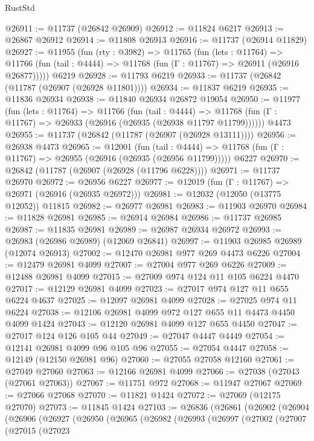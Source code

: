 \begin{lexlean}{RustStd}
\begin{coremodule}
@26911 := @11737 (@26842 @26909)
@26912 := @11824 @6217
@26913 := @26867 @26912
@26914 := @11808 @26913
@26916 := @11737 (@26914 @11829)
@26927 := @11955
    (fun (rty : @3982) =>
    @11765
      (fun (lets : @11764) =>
      @11766 (fun (tail : @4444) => @11768 (fun (Γ : @11767) => @26911 (@26916 @26877)))))
    @6219
@26928 := @11793 @6219
@26933 := @11737 (@26842 (@11787 (@26907 (@26928 @11801))))
@26934 := @11837 @6219
@26935 := @11836 @26934
@26938 := @11840 @26934 @26872 @19054
@26950 := @11977
    (fun (lets : @11764) =>
    @11766
      (fun (tail : @4444) =>
      @11768 (fun (Γ : @11767) => @26933 (@26916 (@26935 (@26938 @11797 @11799))))))
    @4473
@26955 := @11737 (@26842 (@11787 (@26907 (@26928 @13111))))
@26956 := @26938 @4473
@26965 := @12001
    (fun (tail : @4444) => @11768 (fun (Γ : @11767) => @26955 (@26916 (@26935 (@26956 @11799)))))
    @6227
@26970 := @26842 (@11787 (@26907 (@26928 (@11796 @6228))))
@26971 := @11737 @26970
@26972 := @26956 @6227
@26977 := @12019 (fun (Γ : @11767) => @26971 (@26916 (@26935 @26972)))
@26981 := @12032 (@12050 (@13775 @12052)) @11815
@26982 := @26977 @26981
@26983 := @11903 @26970
@26984 := @11828 @26981
@26985 := @26914 @26984
@26986 := @11737 @26985
@26987 := @11835 @26981
@26989 := @26987 @26934 @26972
@26993 := @26983 (@26986 @26989) (@12069 @26841)
@26997 := @11903 @26985 @26989 (@12074 @26913)
@27002 := @12470 @26981 @977 @269 @4473 @6226
@27004 := @12479 @26981 @4099
@27007 := @27004 @977 @269 @6226
@27009 := @12488 @26981 @4099
@27015 := @27009 @974 @124 @11 @105 @6224 @4470
@27017 := @12129 @26981 @4099
@27023 := @27017 @974 @127 @11 @655 @6224 @4637
@27025 := @12097 @26981 @4099
@27028 := @27025 @974 @11 @6224
@27038 := @12106 @26981 @4099 @972 @127 @655 @11 @4473 @4450 @4099 @1424
@27043 := @12120 @26981 @4099 @127 @655 @4450
@27047 := @27017 @124 @126 @105 @44
@27049 := @27047 @4447 @4449
@27054 := @12141 @26981 @4099 @96 @105 @96
@27055 := @27054 @4447
@27058 := @12149 (@12150 @26981 @96)
@27060 := @27055 @27058 @12160
@27061 := @27049 @27060
@27063 := @12166 @26981 @4099
@27066 := @27038 (@27043 (@27061 @27063))
@27067 := @11751 @972
@27068 := @11947 @27067
@27069 := @27066 @27068
@27070 := @11821 @1424
@27072 := @27069 (@12175 @27070)
@27073 := @11845 @1424
@27103 := @26836
    (@26861
      (@26902
        (@26904
          (@26906
            (@26927
              (@26950
                (@26965
                  (@26982
                    (@26993
                      (@26997
                        (@27002
                          (@27007
                            (@27015
                              (@27023

\end{coremodule}
\end{lexlean}
